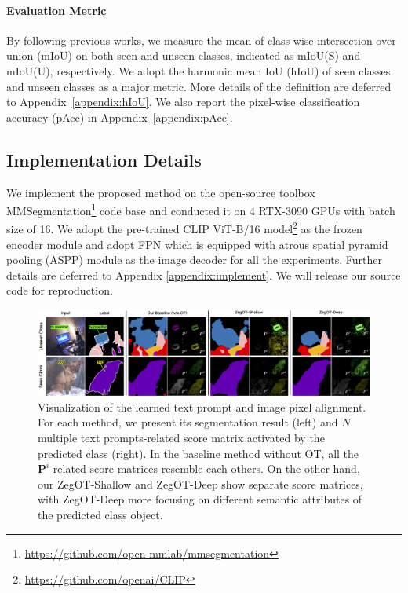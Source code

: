 \documentclass[nohyperref]{article}
\newcommand{\bs}{\boldsymbol}
\theoremstyle{plain}
\theoremstyle{definition}
\theoremstyle{remark}
\begin{document}
\paragraph{Evaluation Metric}
By following previous works, we measure the mean of class-wise intersection over union (mIoU) on both seen and unseen classes, indicated as mIoU(S) and mIoU(U), respectively. We adopt the harmonic mean IoU (hIoU) of seen classes and unseen classes as a major metric. More details of the definition are deferred to Appendix~\ref{appendix:hIoU}. We also report the pixel-wise classification accuracy (pAcc) in Appendix~\ref{appendix:pAcc}. 

\subsection{Implementation Details}
We implement the proposed method on the open-source toolbox MMSegmentation\footnote{\url{https://github.com/open-mmlab/mmsegmentation}} code base and conducted it on 4 RTX-3090 GPUs with batch size of 16.
We adopt the pre-trained CLIP ViT-B/16 model\footnote{\url{https://github.com/openai/CLIP}} as the frozen encoder module and adopt FPN which is equipped with atrous spatial pyramid pooling (ASPP) module as the image decoder for all the experiments.
Further details are deferred to Appendix \ref{appendix:implement}. We will release our source code for reproduction.



\begin{figure}[!t]
\vskip 0.1in
\begin{center}
\includegraphics[width=0.95\linewidth]{fig/scoremap.jpg}
\caption{Visualization of the learned text prompt and image pixel alignment. For each method, we present its segmentation result (left) and $N$ multiple text prompts-related score matrix activated by the predicted class (right). In the baseline method without OT, all the $\bs{P}^i$-related score matrices resemble each others. On the other hand, our ZegOT-Shallow and ZegOT-Deep show separate score matrices, with ZegOT-Deep more focusing on different semantic attributes of the predicted class object.
}
\label{fig_main}
\end{center}
\vskip -0.1in
\end{figure}
\end{document}

